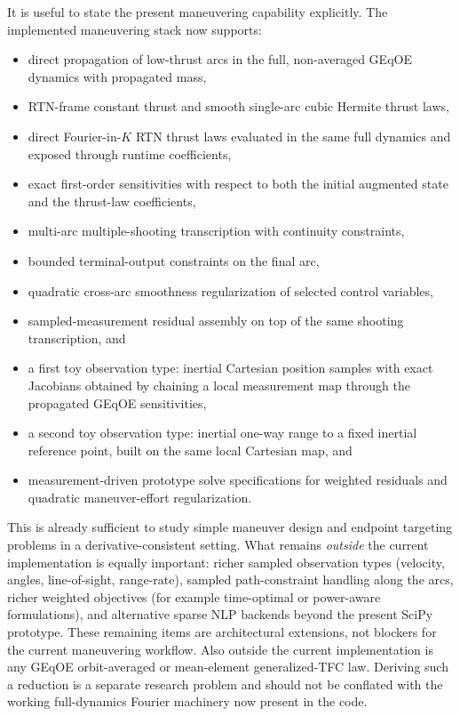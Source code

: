 \documentclass[11pt]{article}
\begin{document}
It is useful to state the present maneuvering capability explicitly. The
implemented maneuvering stack now supports:
\begin{itemize}
    \item direct propagation of low-thrust arcs in the full, non-averaged GEqOE
    dynamics with propagated mass,
    \item RTN-frame constant thrust and smooth single-arc cubic Hermite thrust
    laws,
    \item direct Fourier-in-$K$ RTN thrust laws evaluated in the same full
    dynamics and exposed through runtime coefficients,
    \item exact first-order sensitivities with respect to both the initial
    augmented state and the thrust-law coefficients,
    \item multi-arc multiple-shooting transcription with continuity
    constraints,
    \item bounded terminal-output constraints on the final arc,
    \item quadratic cross-arc smoothness regularization of selected control
    variables,
    \item sampled-measurement residual assembly on top of the same shooting
    transcription, and
    \item a first toy observation type: inertial Cartesian position samples
    with exact Jacobians obtained by chaining a local measurement map through
    the propagated GEqOE sensitivities,
    \item a second toy observation type: inertial one-way range to a fixed
    inertial reference point, built on the same local Cartesian map, and
    \item measurement-driven prototype solve specifications for weighted
    residuals and quadratic maneuver-effort regularization.
\end{itemize}
This is already sufficient to study simple maneuver design and endpoint
targeting problems in a derivative-consistent setting. What remains
\emph{outside} the current implementation is equally important: richer sampled
observation types (velocity, angles, line-of-sight, range-rate), sampled
path-constraint handling along the arcs, richer weighted
objectives (for example time-optimal or power-aware formulations), and
alternative sparse NLP backends beyond the present SciPy prototype. These
remaining items are architectural extensions, not blockers for the current
maneuvering workflow.
Also outside the current implementation is any GEqOE orbit-averaged or
mean-element generalized-TFC law. Deriving such a reduction is a separate
research problem and should not be conflated with the working full-dynamics
Fourier machinery now present in the code.
\end{document}
